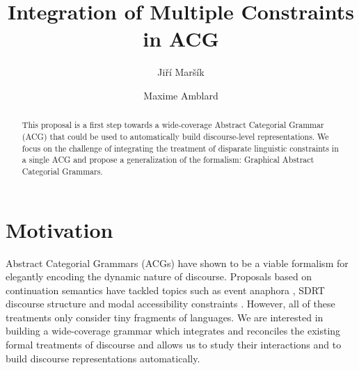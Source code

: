 \documentclass{llncs}
\begin{document}
%
\frontmatter          %
%
\pagestyle{headings}  %

\mainmatter              %
%
\title{Integration of Multiple Constraints in ACG}
%
%
\author{Jiří Maršík \and Maxime Amblard}
%
%
%

\maketitle              %

\begin{abstract}
This proposal is a first step towards a wide-coverage Abstract Categorial
Grammar (ACG) that could be used to automatically build discourse-level
representations. We focus on the challenge of integrating the treatment of
disparate linguistic constraints in a single ACG and propose a generalization
of the formalism: Graphical Abstract Categorial Grammars.
\end{abstract}


\section{Motivation}

Abstract Categorial Grammars (ACGs) have shown to be a viable formalism for
elegantly encoding the dynamic nature of discourse. Proposals based on
continuation semantics \cite{de2006towards} have tackled topics such as event
anaphora \cite{qian2011event}, SDRT discourse structure \cite{asher2011sdrt}
and modal accessibility constraints \cite{asher2011montagovian}. However, all
of these treatments only consider tiny fragments of languages. We are
interested in building a wide-coverage grammar which integrates and reconciles
the existing formal treatments of discourse and allows us to study their
interactions and to build discourse representations automatically.
\end{document}
